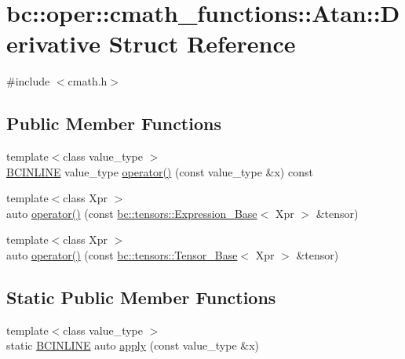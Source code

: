\hypertarget{structbc_1_1oper_1_1cmath__functions_1_1Atan_1_1Derivative}{}\section{bc\+:\+:oper\+:\+:cmath\+\_\+functions\+:\+:Atan\+:\+:Derivative Struct Reference}
\label{structbc_1_1oper_1_1cmath__functions_1_1Atan_1_1Derivative}


{\ttfamily \#include $<$cmath.\+h$>$}

\subsection*{Public Member Functions}
\begin{DoxyCompactItemize}
\item 
{\footnotesize template$<$class value\+\_\+type $>$ }\\\hyperlink{common_8h_a6699e8b0449da5c0fafb878e59c1d4b1}{B\+C\+I\+N\+L\+I\+NE} value\+\_\+type \hyperlink{structbc_1_1oper_1_1cmath__functions_1_1Atan_1_1Derivative_a881e1794e99048dd6430aa031dc9bccf}{operator()} (const value\+\_\+type \&x) const
\item 
{\footnotesize template$<$class Xpr $>$ }\\auto \hyperlink{structbc_1_1oper_1_1cmath__functions_1_1Atan_1_1Derivative_adfe95224645b4ad69c44f7da5a145fea}{operator()} (const \hyperlink{classbc_1_1tensors_1_1Expression__Base}{bc\+::tensors\+::\+Expression\+\_\+\+Base}$<$ Xpr $>$ \&tensor)
\item 
{\footnotesize template$<$class Xpr $>$ }\\auto \hyperlink{structbc_1_1oper_1_1cmath__functions_1_1Atan_1_1Derivative_a73fbecc62bf6a639f0c94806fb6bc2d6}{operator()} (const \hyperlink{classbc_1_1tensors_1_1Tensor__Base}{bc\+::tensors\+::\+Tensor\+\_\+\+Base}$<$ Xpr $>$ \&tensor)
\end{DoxyCompactItemize}
\subsection*{Static Public Member Functions}
\begin{DoxyCompactItemize}
\item 
{\footnotesize template$<$class value\+\_\+type $>$ }\\static \hyperlink{common_8h_a6699e8b0449da5c0fafb878e59c1d4b1}{B\+C\+I\+N\+L\+I\+NE} auto \hyperlink{structbc_1_1oper_1_1cmath__functions_1_1Atan_1_1Derivative_ab5330d5f48b25bc604f9cfc75f77040e}{apply} (const value\+\_\+type \&x)
\end{DoxyCompactItemize}


